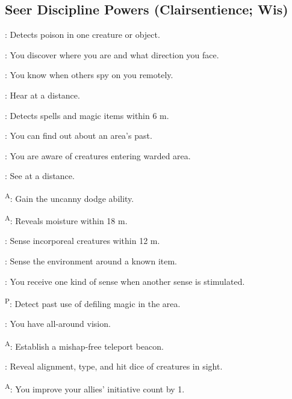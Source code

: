 \subsection{Seer Discipline Powers {\normalsize(Clairsentience; Wis)}}
\begin{enumerate*}
\item {}: Detects poison in one creature or object.

      : You discover where you are and what direction you face.

      : You know when others spy on you remotely.

\item {}: Hear at a distance.

      : Detects spells and magic items within 6 m.

      : You can find out about an area's past.

      : You are aware of creatures entering warded area.

\item {}: See at a distance.

      \textsuperscript{A}: Gain the uncanny dodge ability.

      \textsuperscript{A}: Reveals moisture within 18 m.

      : Sense incorporeal creatures within 12 m.

      : Sense the environment around a known item.

      : You receive one kind of sense when another sense is stimulated.

      \textsuperscript{P}: Detect past use of defiling magic in the area.

      : You have all-around vision.

\item {}\textsuperscript{A}: Establish a mishap-free teleport beacon.

      : Reveal alignment, type, and hit dice of creatures in sight.

      \textsuperscript{A}: You improve your allies' initiative count by 1.


\end{enumerate*}
